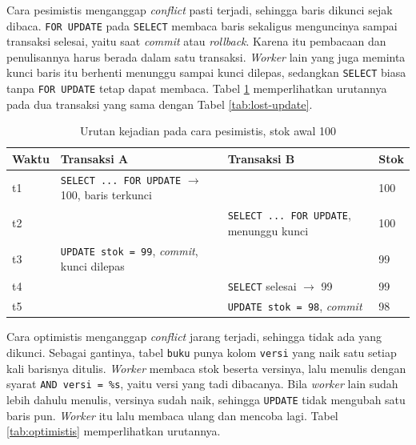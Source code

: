 Cara pesimistis menganggap \textit{conflict} pasti terjadi, sehingga baris
dikunci sejak dibaca. \texttt{FOR UPDATE} pada \texttt{SELECT} membaca baris
sekaligus menguncinya sampai transaksi selesai, yaitu saat \textit{commit} atau
\textit{rollback}. Karena itu pembacaan dan penulisannya harus berada dalam
satu transaksi. \textit{Worker} lain yang juga meminta kunci baris itu berhenti
menunggu sampai kunci dilepas, sedangkan \texttt{SELECT} biasa tanpa
\texttt{FOR UPDATE} tetap dapat membaca. Tabel \ref{tab:pesimistis} memperlihatkan
urutannya pada dua transaksi yang sama dengan Tabel \ref{tab:lost-update}.

\begin{table}[!htb]
  \centering
  \caption{Urutan kejadian pada cara pesimistis, stok awal 100}
  \label{tab:pesimistis}
  \begin{tabularx}{\textwidth}{lXXl}
    \hline
    \textbf{Waktu} & \textbf{Transaksi A} & \textbf{Transaksi B} & \textbf{Stok} \\
    \hline
    t1 & \texttt{SELECT ... FOR UPDATE} $\rightarrow$ 100, baris terkunci & & 100 \\
    \hline
    t2 & & \texttt{SELECT ... FOR UPDATE}, menunggu kunci & 100 \\
    \hline
    t3 & \texttt{UPDATE stok = 99}, \textit{commit}, kunci dilepas & & 99 \\
    \hline
    t4 & & \texttt{SELECT} selesai $\rightarrow$ 99 & 99 \\
    \hline
    t5 & & \texttt{UPDATE stok = 98}, \textit{commit} & 98 \\
    \hline
  \end{tabularx}
\end{table}

Cara optimistis menganggap \textit{conflict} jarang terjadi, sehingga tidak ada yang
dikunci. Sebagai gantinya, tabel \texttt{buku} punya kolom \texttt{versi} yang
naik satu setiap kali barisnya ditulis. \textit{Worker} membaca stok beserta versinya,
lalu menulis dengan syarat \texttt{AND versi = \%s}, yaitu versi yang tadi
dibacanya. Bila \textit{worker} lain sudah lebih dahulu menulis, versinya sudah naik,
sehingga \texttt{UPDATE} tidak mengubah satu baris pun. \textit{Worker} itu lalu
membaca ulang dan mencoba lagi. Tabel \ref{tab:optimistis} memperlihatkan
urutannya.

